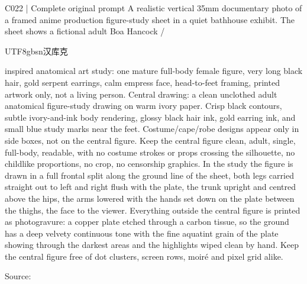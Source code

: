 \begin{selectedprompt}{C022 | Complete original prompt}
\label{prompt:selected-C022}
A realistic vertical 35mm documentary photo of a framed anime production figure-study sheet in a quiet bathhouse exhibit. The sheet shows a fictional adult Boa Hancock / \begin{CJK*}{UTF8}{gbsn}汉库克\end{CJK*} inspired anatomical art study: one mature full-body female figure, very long black hair, gold serpent earrings, calm empress face, head-to-feet framing, printed artwork only, not a living person. Central drawing: a clean unclothed adult anatomical figure-study drawing on warm ivory paper. Crisp black contours, subtle ivory-and-ink body rendering, glossy black hair ink, gold earring ink, and small blue study marks near the feet. Costume/cape/robe designs appear only in side boxes, not on the central figure. Keep the central figure clean, adult, single, full-body, readable, with no costume strokes or props crossing the silhouette, no childlike proportions, no crop, no censorship graphics. In the study the figure is drawn in a full frontal split along the ground line of the sheet, both legs carried straight out to left and right flush with the plate, the trunk upright and centred above the hips, the arms lowered with the hands set down on the plate between the thighs, the face to the viewer. Everything outside the central figure is printed as photogravure: a copper plate etched through a carbon tissue, so the ground has a deep velvety continuous tone with the fine aquatint grain of the plate showing through the darkest areas and the highlights wiped clean by hand. Keep the central figure free of dot clusters, screen rows, moiré and pixel grid alike.
\end{selectedprompt}
{\scriptsize Source: \par}

